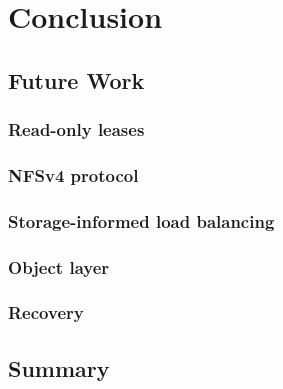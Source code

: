 \chapter{Conclusion}\label{cha:conclusion}

\section{Future Work}
\subsection{Read-only leases}
\subsection{NFSv4 protocol}
\subsection{Storage-informed load balancing}
\subsection{Object layer}
\subsection{Recovery}

\section{Summary}